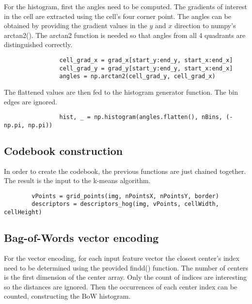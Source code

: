 \documentclass[10pt,a4paper,twoside]{article}
\begin{document}
For the histogram, first the angles need to be computed. The gradients of
interest in the cell are extracted using the cell's four corner point. The
angles can be obtained by providing the gradient values in the $y$ and $x$
direction to numpy's arctan2(). The arctan2 function is needed so that angles
from all 4 quadrants are distinguished correctly.

\begin{verbatim}
                cell_grad_x = grad_x[start_y:end_y, start_x:end_x]
                cell_grad_y = grad_y[start_y:end_y, start_x:end_x]
                angles = np.arctan2(cell_grad_y, cell_grad_x)
\end{verbatim}

The flattened values are then fed to the histogram generator function. The bin
edges are ignored.

\begin{verbatim}
                hist, _ = np.histogram(angles.flatten(), nBins, (-np.pi, np.pi))
\end{verbatim}

\subsection{Codebook construction}
In order to create the codebook, the previous functions are just chained
together. The result is the input to the k-means algorithm.

\begin{verbatim}
        vPoints = grid_points(img, nPointsX, nPointsY, border)
        descriptors = descriptors_hog(img, vPoints, cellWidth, cellHeight)
\end{verbatim}


\subsection{Bag-of-Words vector encoding}
For the vector encoding, for each input feature vector the closest center's index
need to be determined using the provided findd() function. The number of centers
is the first dimension of the center array. Only the count of indices
are interesting so the distances are ignored. Then the occurrences of each center
index can be counted, constructing the BoW histogram.
\end{document}

